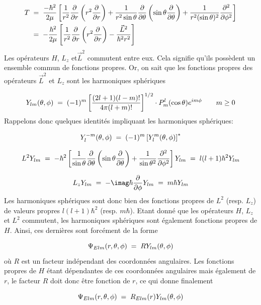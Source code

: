 \begin{align*}
    T&\; = \; 
    \dfrac{-\hbar^2}{2\mu}\left[\dfrac{1}{r^2}\dfrac{\partial}{\partial r}\left(r^2\dfrac{\partial}{\partial r}\right)+\dfrac{1}{r^2\sin{\theta}}\dfrac{\partial}{\partial \theta}\left(\sin{\theta}\dfrac{\partial}{\partial \theta}\right)+\dfrac{1}{r^2(\sin{\theta})^2}\dfrac{\partial ^2}{\partial\phi^2}\right]\\
    &\; = \;-\dfrac{\hbar^2}{2\mu}\left[\dfrac{1}{r^2}\dfrac{\partial}{\partial r}\left(r^2\dfrac{\partial}{\partial r}\right)-\dfrac{\Vec{L}^2}{\hbar^2r^2}\right]
\end{align*}
Les opérateurs $H$, $L_z$ et$\Vec{L}^2$ commutent entre eux. Cela signifie qu'ils possèdent un ensemble commun de fonctions propres. Or, on sait que les fonctions propres des opérateurs $\Vec{L}^2$ et $L_z$ sont les harmoniques sphériques

\begin{align*}
    Y_{lm}(\theta, \phi) \; = \; (-1)^m \left[ \dfrac{(2l+1)(l-m)!}{4\pi(l+m)!}\right]^{1/2} \cdot P^{l}_{m}(\cos{\theta})e^{im\phi} \qquad m\ge0
\end{align*}
Rappelons donc quelques identités impliquant les harmoniques sphériques: 


\[
    Y_{l}^{-m}(\theta, \phi)\; = \; (-1)^m\left[Y_{l}^{m}(\theta, \phi)\right]^{*}
\]

\[
    L^2Y_{lm}\; = \;-\hbar^2 \left[\dfrac{1}{\sin{\theta}}\dfrac{\partial}{\partial\theta}\left(\sin{\theta}\dfrac{\partial}{\partial\theta}\right)+\dfrac{1}{\sin{\theta}^2}\dfrac{\partial^2}{\partial\phi^2}\right]Y_{lm}\; = \; l(l+1)\hbar^2Y_{lm}
\]

\[
    L_zY_{lm}\eq-\imag\hbar\dfrac{\partial}{\partial\phi}Y_{lm}\eq m\hbar Y_{lm}
\]
Les harmoniques sphériques sont donc bien des fonctions propres de $L^2$ (resp. $L_z$) de valeurs propres $l(l+1)\hbar^2$ (resp. $m\hbar$). Etant donné que les opérateurs $H$, $L_z$ et $L^2$ commutent, les harmoniques sphériques sont également fonctions propres de $H$. Ainsi, ces dernières sont forcément de la forme 

\[
    \Psi_{Elm}(r,\theta,\phi)\; = \; R Y_{lm}(\theta,\phi)
\]
où $R$ est un facteur indépendant des coordonnées angulaires. Les fonctions propres de $H$ étant dépendantes de ces coordonnées angulaires mais également de $r$, le facteur $R$ doit donc être fonction de $r$, ce qui donne finalement

\begin{equation}
    \Psi_{Elm}(r,\theta,\phi)\; = \; R_{Elm}(r) Y_{lm}(\theta,\phi)
    \label{decompopsi}
\end{equation}



